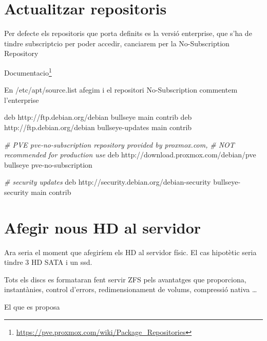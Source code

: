 \documentclass[
  10pt,
]{krantz}
\newenvironment{Shaded}{\begin{snugshade}}{\end{snugshade}}
\newcommand{\CommentTok}[1]{\textcolor[rgb]{0.56,0.35,0.01}{\textit{#1}}}
\newcommand{\ExtensionTok}[1]{#1}
\newcommand{\NormalTok}[1]{#1}
\DeclareRobustCommand{\href}[2]{#2\footnote{\url{#1}}}
\begin{document}
\hypertarget{actualitzar-repositoris}{%
\section{Actualitzar repositoris}\label{actualitzar-repositoris}}

Per defecte els repositoris que porta definits es la versió enterprise, que s'ha de tindre subscriptcio per poder accedir, canciarem per la No-Subscription Repository

\href{https://pve.proxmox.com/wiki/Package_Repositories}{Documentacio}

En /etc/apt/source.list afegim i el repositori No-Subscription commentem l'enterprise

\begin{Shaded}
\begin{Highlighting}[]
\ExtensionTok{deb}\NormalTok{ http://ftp.debian.org/debian bullseye main contrib}
\ExtensionTok{deb}\NormalTok{ http://ftp.debian.org/debian bullseye{-}updates main contrib}

\CommentTok{\# PVE pve{-}no{-}subscription repository provided by proxmox.com,}
\CommentTok{\# NOT recommended for production use}
\ExtensionTok{deb}\NormalTok{ http://download.proxmox.com/debian/pve bullseye pve{-}no{-}subscription}

\CommentTok{\# security updates}
\ExtensionTok{deb}\NormalTok{ http://security.debian.org/debian{-}security bullseye{-}security main contrib}
\end{Highlighting}
\end{Shaded}

\hypertarget{afegir-nous-hd-al-servidor}{%
\section{Afegir nous HD al servidor}\label{afegir-nous-hd-al-servidor}}

Ara seria el moment que afegiríem els HD al servidor físic. El cas hipotètic seria tindre 3 HD SATA i un ssd.

Tots els discs es formataran fent servir ZFS pels avantatges que proporciona, instantànies, control d'errors, redimensionament de volums, compressió nativa \ldots{}

El que es proposa
\end{document}
